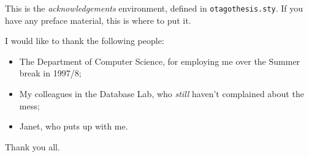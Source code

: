 This is the {\em acknowledgements} environment, defined in
{\tt otagothesis.sty}.  If you have any preface material, this is where to
put it.  

I would like to thank the following people:
  \begin{itemize}
  \item The Department of Computer Science, for employing me over the
  Summer break in 1997/8;
  \item My colleagues in the Database Lab, who {\em still} haven't
  complained about the mess;
  \item Janet, who puts up with me.
  \end{itemize}
Thank you all.
